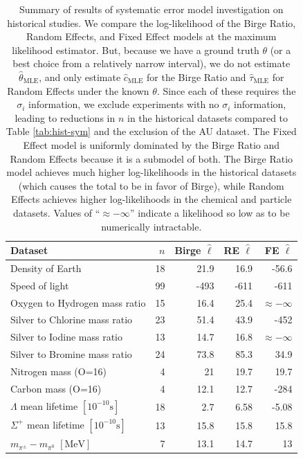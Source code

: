 \documentclass[12pt]{article}
\begin{document}
\begin{table}
\centering
\caption{Summary of results of systematic error model investigation on historical studies. We compare the log-likelihood of the Birge Ratio, Random Effects, and Fixed Effect models at the maximum likelihood estimator. But, because we have a ground truth $\theta$ (or a best choice from a relatively narrow interval), we do not estimate $\hat\theta_{\mathrm{MLE}}$, and only estimate $\hat{c}_{\mathrm{MLE}}$ for the Birge Ratio and $\hat{\tau}_{\mathrm{MLE}}$ for Random Effects under the known $\theta$. Since each of these requires the $\sigma_i$ information, we exclude experiments with no $\sigma_i$ information, leading to reductions in $n$ in the historical datasets compared to Table \ref{tab:hist-sym} and the exclusion of the AU dataset. The Fixed Effect model is uniformly dominated by the Birge Ratio and Random Effects because it is a submodel of both. The Birge Ratio model achieves much higher log-likelihoods in the historical datasets (which causes the total to be in favor of Birge), while Random Effects achieves higher log-likelihoods in the chemical and particle datasets. Values of ``$\approx-\infty$'' indicate a likelihood so low as to be numerically intractable.}
\label{tab:hist-syst}
\smaller
\begin{tabular}{lrrrr}
  \hline Dataset & $n$ & Birge $\hat\ell$ & RE $\hat\ell$ & FE $\hat\ell$ \\\hline
  Density of Earth & 18 & 21.9 & 16.9 & -56.6 \\
  Speed of light & 99 & -493 & -611 & -611 \\\hline
  Oxygen to Hydrogen mass ratio & 15 & 16.4 & 25.4 & $\approx-\infty$ \\
  Silver to Chlorine mass ratio & 23 & 51.4 & 43.9 & -452 \\
  Silver to Iodine mass ratio & 13 & 14.7 & 16.8 & $\approx-\infty$ \\
  Silver to Bromine mass ratio & 24 & 73.8 & 85.3 & 34.9 \\
  Nitrogen mass (O=16) & 4 & 21 & 19.7 & 19.7 \\
  Carbon mass (O=16) & 4 & 12.1 & 12.7 & -284 \\\hline
  $\Lambda$ mean lifetime $\mathrm{[10^{-10}s]}$ & 18 & 2.7 & 6.58 & -5.08 \\
  $\Sigma^+$ mean lifetime $\mathrm{[10^{-10}s]}$ & 13 & 15.8 & 15.8 & 15.8 \\
  $m_{\pi^\pm}-m_{\pi^0}$ $\mathrm{[MeV]}$ & 7 & 13.1 & 14.7 & 13 \\

\end{tabular}
\end{table}
\end{document}
